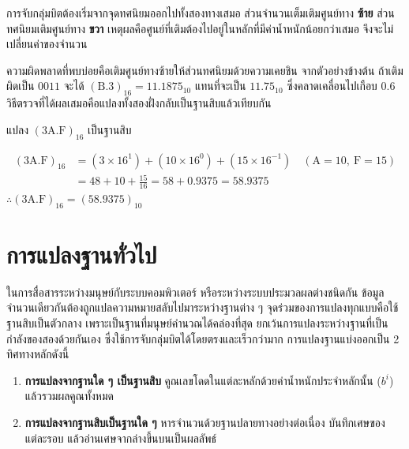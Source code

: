 \begin{warning}
การจับกลุ่มบิตต้องเริ่มจากจุดทศนิยมออกไปทั้งสองทางเสมอ ส่วนจำนวนเต็มเติมศูนย์ทาง \textbf{ซ้าย} ส่วนทศนิยมเติมศูนย์ทาง \textbf{ขวา} เหตุผลคือศูนย์ที่เติมต้องไปอยู่ในหลักที่มีค่าน้ำหนักน้อยกว่าเสมอ จึงจะไม่เปลี่ยนค่าของจำนวน

ความผิดพลาดที่พบบ่อยคือเติมศูนย์ทางซ้ายให้ส่วนทศนิยมด้วยความเคยชิน จากตัวอย่างข้างต้น ถ้าเติมผิดเป็น $0011$ จะได้ $(\mathrm{B}.3)_{16} = 11.1875_{10}$ แทนที่จะเป็น $11.75_{10}$ ซึ่งคลาดเคลื่อนไปเกือบ $0.6$ วิธีตรวจที่ได้ผลเสมอคือแปลงทั้งสองฝั่งกลับเป็นฐานสิบแล้วเทียบกัน
\end{warning}

\begin{ex}
\label{ex:hex-frac-to-dec}
แปลง $(3\mathrm{A}.\mathrm{F})_{16}$ เป็นฐานสิบ
\end{ex}
\begin{solution}
\begin{align*}
(3\mathrm{A}.\mathrm{F})_{16} &= (3\times16^1)+(10\times16^0)+(15\times16^{-1}) \quad (\mathrm{A}=10,\ \mathrm{F}=15)\\
&= 48 + 10 + \frac{15}{16} = 58 + 0.9375 = 58.9375
\end{align*}
$\therefore (3\mathrm{A}.\mathrm{F})_{16} = (58.9375)_{10}$ \solhere
\end{solution}


\section{การแปลงฐานทั่วไป}
\label{sec:general-base-conversion}

ในการสื่อสารระหว่างมนุษย์กับระบบคอมพิวเตอร์ หรือระหว่างระบบประมวลผลต่างชนิดกัน ข้อมูลจำนวนเดียวกันต้องถูกแปลความหมายสลับไปมาระหว่างฐานต่าง ๆ จุดร่วมของการแปลงทุกแบบคือใช้ฐานสิบเป็นตัวกลาง เพราะเป็นฐานที่มนุษย์คำนวณได้คล่องที่สุด ยกเว้นการแปลงระหว่างฐานที่เป็นกำลังของสองด้วยกันเอง ซึ่งใช้การจับกลุ่มบิตได้โดยตรงและเร็วกว่ามาก การแปลงฐานแบ่งออกเป็น 2 ทิศทางหลักดังนี้~\parencite{kolman2008discrete}
\begin{enumerate}[label=\textbf{\arabic*.}]
    \item \textbf{การแปลงจากฐานใด ๆ เป็นฐานสิบ} คูณเลขโดดในแต่ละหลักด้วยค่าน้ำหนักประจำหลักนั้น ($b^i$) แล้วรวมผลคูณทั้งหมด
    \item \textbf{การแปลงจากฐานสิบเป็นฐานใด ๆ} หารจำนวนด้วยฐานปลายทางอย่างต่อเนื่อง บันทึกเศษของแต่ละรอบ แล้วอ่านเศษจากล่างขึ้นบนเป็นผลลัพธ์
\end{enumerate}

